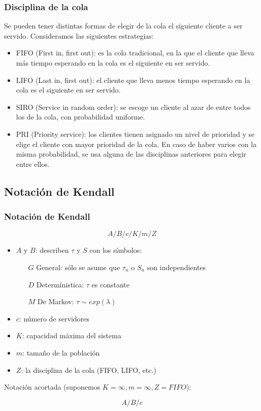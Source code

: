 \documentclass[8pt]{beamer}
\begin{document}
  \begin{frame}\frametitle{Disciplina de la cola}
    Se pueden tener distintas formas de elegir de la cola el siguiente cliente a ser servido. Consideramos las siguientes estrategias:
    \begin{itemize}
    \item FIFO (First in, first out): es la cola tradicional, en la que el cliente que lleva más tiempo esperando en la cola es el siguiente en ser servido.
    \item LIFO (Last in, first out): el cliente que lleva menos tiempo esperando en la cola es el siguiente en ser servido.
    \item SIRO (Service in random order): se escoge un cliente al azar de entre todos los de la cola, con probabilidad uniforme.
    \item PRI (Priority  service): los clientes tienen asignado un nivel de prioridad y se elige el cliente con mayor prioridad de la cola. En caso de haber varios con la misma probabilidad, se usa alguna de las disciplinas anteriores para elegir entre ellos.
    \end{itemize}

  \end{frame}

  \subsection{Notación de Kendall}
  \begin{frame}\frametitle{Notación de Kendall}
    \begin{exampleblock}{$$A/B/c/K/m/Z$$}
    \end{exampleblock}
    \begin{itemize}
    \item $A$ y $B$: describen $\tau$ y $S$ con los símbolos:
      \begin{itemize}
      \item [$G$]
        General: sólo se asume que $\tau_n$ o $S_n$ son independientes
      \item [$D$]
        Determínistica: $\tau$ es constante
      \item [$M$]
        De Markov: $\tau \sim exp(\lambda)$
      \end{itemize}
    \item $c$: número de servidores
    \item $K$: capacidad máxima del sistema
    \item $m$: tamaño de la población
    \item $Z$: la disciplina de la cola (FIFO, LIFO, etc.)
    \end{itemize}

    Notación acortada (suponemos $K=\infty,m=\infty,Z=FIFO$):
    \begin{exampleblock}{$$A/B/c$$}
    \end{exampleblock}
  \end{frame}
\end{document}
